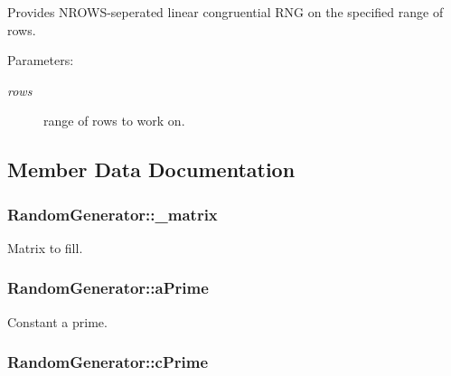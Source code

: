 Provides NROWS-seperated linear congruential RNG on the specified range of rows. \begin{Desc}
\item[Parameters:]
\begin{description}
\item[{\em rows}]range of rows to work on. \end{description}
\end{Desc}


\subsection{Member Data Documentation}
\hypertarget{class_random_generator_9fb2b8631b95d10abb2f013319d37f3f}{
\subsubsection[{\_\-matrix}]{ {\bf RandomGenerator::\_\-matrix}}}
\label{class_random_generator_9fb2b8631b95d10abb2f013319d37f3f}


Matrix to fill. \hypertarget{class_random_generator_3f733ddf90320aace1be173bdc7381da}{
\subsubsection[{aPrime}]{ {\bf RandomGenerator::aPrime}}}
\label{class_random_generator_3f733ddf90320aace1be173bdc7381da}


Constant a prime. \hypertarget{class_random_generator_990ae8409e5290b6e911b609fb61d8c8}{
\subsubsection[{cPrime}]{ {\bf RandomGenerator::cPrime}}}
\label{class_random_generator_990ae8409e5290b6e911b609fb61d8c8}


